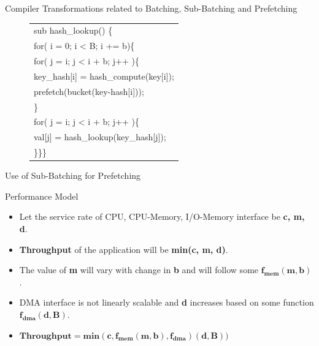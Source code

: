 \documentclass[final]{beamer}
\newlength{\sepwid}
\newlength{\onecolwid}
\newlength{\twocolwid}
\begin{document}
\begin{frame}
\begin{columns}[t]
\begin{column}{\twocolwid}
\begin{exampleblock}{Compiler Transformations related to Batching, Sub-Batching and Prefetching}
\begin{multicols}{3}
\begin{figure}[ht]
\begin{tiny}
\begin{tabular}[b]{p{\onecolwid}}
sub{ hash\_lookup()} \{\\
\hspace{0.4\sepwid}for( i = 0; i < B; i += b)\{\\
\hspace{0.6\sepwid}for( j = i; j < i + b; j++ )\{\\
\hspace{0.8\sepwid}key\_hash[i] = hash\_compute(key[i]);\\
\hspace{0.8\sepwid}prefetch(bucket(key-hash[i]));\\
\hspace{0.6\sepwid}\}\\
\hspace{0.6\sepwid}for( j = i; j < i + b; j++ )\{\\
\hspace{0.8\sepwid}val[j] = hash\_lookup(key\_hash[j]);\\
\}\hspace{0.4\sepwid}\}\hspace{0.2\sepwid}\}
\end{tabular}
\end{tiny}
\end{figure}
Use of Sub-Batching for Prefetching
\end{multicols}
\end{exampleblock}

\begin{alertblock}{Performance Model}
\begin{itemize}
 \item Let the service rate of CPU, CPU-Memory, I/O-Memory interface be {\bf c, m, d}.
 \item {\bf Throughput} of the application will be {\bf min(c, m, d)}.
 \item The value of {\bf m} will vary with change in {\bf b} and will follow some $\boldsymbol{f_{mem}(m, b)}$.
 \item DMA interface is not linearly scalable and {\bf d} increases based on some function $\boldsymbol{f_{dma} (d,B)}$.
 \item $\boldsymbol{Throughput = min(c, f_{mem}(m, b), f_{dma})(d, B))}$
\end{itemize}  
\end{alertblock} 


\end{column}
\end{columns}
\end{frame}
\end{document}
